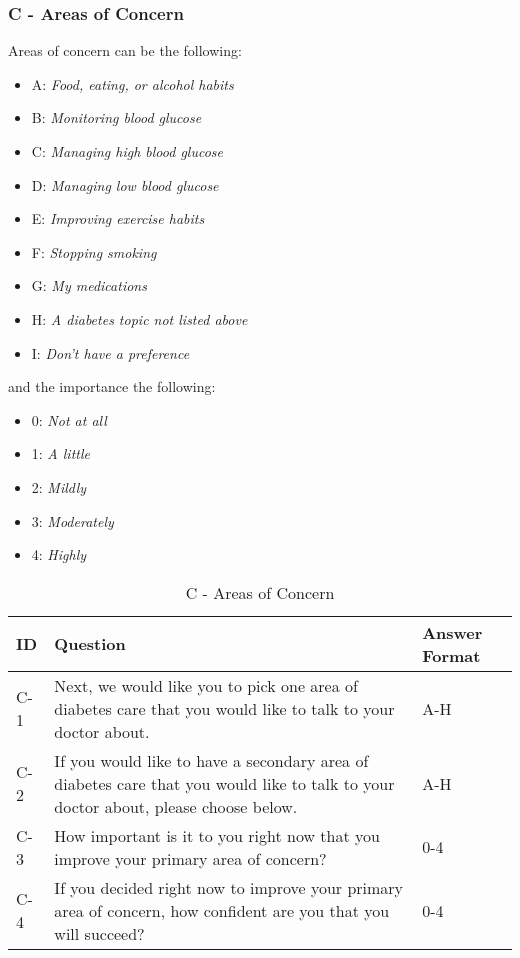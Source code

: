 \subsubsection{C - Areas of Concern}\label{sec:C-areas-of-concern}
Areas of concern can be the following:
\begin{itemize}
    \item A: \emph{Food, eating, or alcohol habits}
    \item B: \emph{Monitoring blood glucose}
    \item C: \emph{Managing high blood glucose}
    \item D: \emph{Managing low blood glucose}
    \item E: \emph{Improving exercise habits}
    \item F: \emph{Stopping smoking}
    \item G: \emph{My medications}
    \item H: \emph{A diabetes topic not listed above}
    \item I: \emph{Don't have a preference}
\end{itemize}
and the importance the following:
\begin{itemize}
    \item 0: \emph{Not at all}
    \item 1: \emph{A little}
    \item 2: \emph{Mildly}
    \item 3: \emph{Moderately}
    \item 4: \emph{Highly}
\end{itemize}
\begin{table}[H]
    \centering
    \renewcommand{\arraystretch}{1.2}
    \begin{tabularx}{\textwidth}{|l|X|l|}
        \hline
        \textbf{ID} & \textbf{Question} & \textbf{Answer Format} \\ \hline
        C-1 & Next, we would like you to pick one area of diabetes care that you would like to talk to your doctor about. & A-H \\ \hline
        C-2 & If you would like to have a secondary area of diabetes care that you would like to talk to your doctor about, please choose below. & A-H \\ \hline
        C-3 & How important is it to you right now that you improve your primary area of concern? & 0-4 \\ \hline
        C-4 & If you decided right now to improve your primary area of concern, how confident are you that you will succeed? & 0-4 \\ \hline
    \end{tabularx}
    \caption{C - Areas of Concern}
    \label{tab:areas-of-concern}
\end{table}


